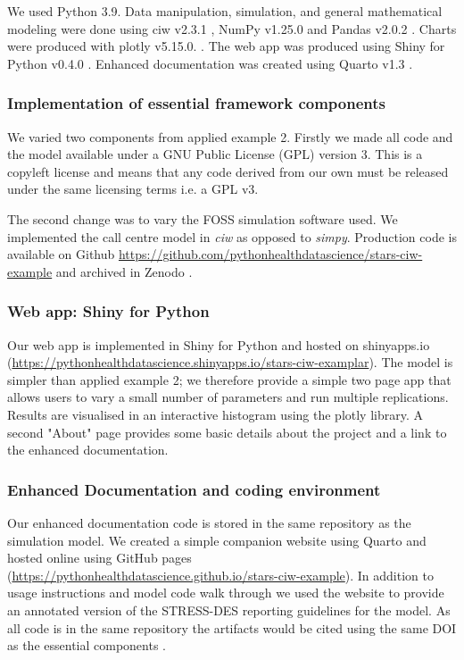 \documentclass[]{interact}
\theoremstyle{plain}%
\theoremstyle{definition}
\theoremstyle{remark}
\begin{document}
We used Python 3.9. Data manipulation, simulation, and general mathematical modeling were done using ciw v2.3.1 \citep{ciw}, NumPy v1.25.0 \citep{numpy} and Pandas v2.0.2 \citep{mckinney2011pandas}. Charts were produced with plotly v5.15.0. \citep{jupyterlab_jupyterlab_2022}. The web app was produced using Shiny for Python v0.4.0 \citep{shinypy}.  Enhanced documentation was created using Quarto v1.3 \citep{quarto}.

\subsubsection{Implementation of essential framework components}

We varied two components from applied example 2.  Firstly we made all code and the model available under a GNU Public License (GPL) version 3. This is a copyleft license and means that any code derived from our own must be released under the same licensing terms i.e. a GPL v3.  

The second change was to vary the FOSS simulation software used. We implemented the call centre model in \textit{ciw} as opposed to \textit{simpy}.  Production code is available on Github \url{https://github.com/pythonhealthdatascience/stars-ciw-example} and archived in Zenodo \citep{applied_example3}.

\subsubsection{Web app: Shiny for Python}

Our web app is implemented in Shiny for Python and hosted on shinyapps.io (\url{https://pythonhealthdatascience.shinyapps.io/stars-ciw-examplar}). The model is simpler than applied example 2; we therefore provide a simple two page app that allows users to vary a small number of parameters and run multiple replications.  Results are visualised in an interactive histogram using the plotly library. A second "About" page provides some basic details about the project and a link to the enhanced documentation.  


\subsubsection{Enhanced Documentation and coding environment}

Our enhanced documentation code is stored in the same repository as the simulation model. We created a simple companion website using Quarto and hosted online using GitHub pages (\url{https://pythonhealthdatascience.github.io/stars-ciw-example}). In addition to usage instructions and model code walk through we used the website to provide an annotated version of the STRESS-DES reporting guidelines for the model. As all code is in the same repository the artifacts would be cited using the same DOI as the essential components \citep{applied_example3}. 
\end{document}
